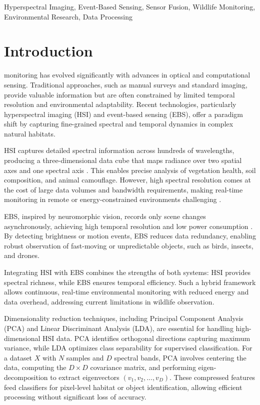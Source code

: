 \documentclass[conference]{IEEEtran}
\begin{document}
\begin{IEEEkeywords}
Hyperspectral Imaging, Event-Based Sensing, Sensor Fusion, Wildlife Monitoring, Environmental Research, Data Processing
\end{IEEEkeywords}

\section{Introduction}
 monitoring has evolved significantly with advances in optical and computational sensing. Traditional approaches, such as manual surveys and standard imaging, provide valuable information but are often constrained by limited temporal resolution and environmental adaptability. Recent technologies, particularly hyperspectral imaging (HSI) and event-based sensing (EBS), offer a paradigm shift by capturing fine-grained spectral and temporal dynamics in complex natural habitats.

HSI captures detailed spectral information across hundreds of wavelengths, producing a three-dimensional data cube that maps radiance over two spatial axes and one spectral axis \cite{yu2025active}. This enables precise analysis of vegetation health, soil composition, and animal camouflage. However, high spectral resolution comes at the cost of large data volumes and bandwidth requirements, making real-time monitoring in remote or energy-constrained environments challenging \cite{connolly2023}.

EBS, inspired by neuromorphic vision, records only scene changes asynchronously, achieving high temporal resolution and low power consumption \cite{arxiv2024}. By detecting brightness or motion events, EBS reduces data redundancy, enabling robust observation of fast-moving or unpredictable objects, such as birds, insects, and drones.

Integrating HSI with EBS combines the strengths of both systems: HSI provides spectral richness, while EBS ensures temporal efficiency. Such a hybrid framework allows continuous, real-time environmental monitoring with reduced energy and data overhead, addressing current limitations in wildlife observation.

Dimensionality reduction techniques, including Principal Component Analysis (PCA) and Linear Discriminant Analysis (LDA), are essential for handling high-dimensional HSI data. PCA identifies orthogonal directions capturing maximum variance, while LDA optimizes class separability for supervised classification. For a dataset $X$ with $N$ samples and $D$ spectral bands, PCA involves centering the data, computing the $D \times D$ covariance matrix, and performing eigen-decomposition to extract eigenvectors $(v_1, v_2, ..., v_D)$. These compressed features feed classifiers for pixel-level habitat or object identification, allowing efficient processing without significant loss of accuracy.
\end{document}
